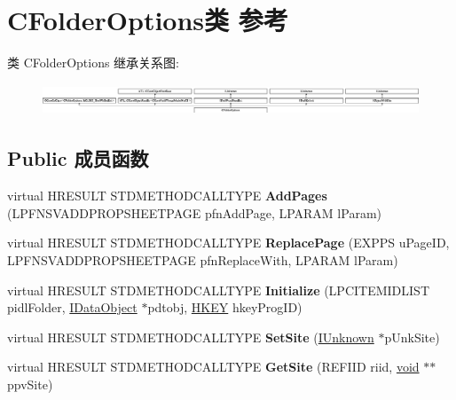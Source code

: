\hypertarget{class_c_folder_options}{}\section{C\+Folder\+Options类 参考}
\label{class_c_folder_options}
类 C\+Folder\+Options 继承关系图\+:\begin{figure}[H]
\begin{center}
\leavevmode
\includegraphics[height=0.943820cm]{class_c_folder_options}
\end{center}
\end{figure}
\subsection*{Public 成员函数}
\begin{DoxyCompactItemize}
\item 
\mbox{\label{class_c_folder_options_a207741f44e6996e8a4e0b17f4b75cbce}} 
virtual H\+R\+E\+S\+U\+LT S\+T\+D\+M\+E\+T\+H\+O\+D\+C\+A\+L\+L\+T\+Y\+PE {\bfseries Add\+Pages} (L\+P\+F\+N\+S\+V\+A\+D\+D\+P\+R\+O\+P\+S\+H\+E\+E\+T\+P\+A\+GE pfn\+Add\+Page, L\+P\+A\+R\+AM l\+Param)
\item 
\mbox{\label{class_c_folder_options_adf0a7376def961ceab74f314aaf0b57e}} 
virtual H\+R\+E\+S\+U\+LT S\+T\+D\+M\+E\+T\+H\+O\+D\+C\+A\+L\+L\+T\+Y\+PE {\bfseries Replace\+Page} (E\+X\+P\+PS u\+Page\+ID, L\+P\+F\+N\+S\+V\+A\+D\+D\+P\+R\+O\+P\+S\+H\+E\+E\+T\+P\+A\+GE pfn\+Replace\+With, L\+P\+A\+R\+AM l\+Param)
\item 
\mbox{\label{class_c_folder_options_a7de8b9322091b2c101a9945c085fb568}} 
virtual H\+R\+E\+S\+U\+LT S\+T\+D\+M\+E\+T\+H\+O\+D\+C\+A\+L\+L\+T\+Y\+PE {\bfseries Initialize} (L\+P\+C\+I\+T\+E\+M\+I\+D\+L\+I\+ST pidl\+Folder, \hyperlink{interface_i_data_object}{I\+Data\+Object} $\ast$pdtobj, \hyperlink{interfacevoid}{H\+K\+EY} hkey\+Prog\+ID)
\item 
\mbox{\label{class_c_folder_options_ac48a0cb053560b7d314e276b3d461bb9}} 
virtual H\+R\+E\+S\+U\+LT S\+T\+D\+M\+E\+T\+H\+O\+D\+C\+A\+L\+L\+T\+Y\+PE {\bfseries Set\+Site} (\hyperlink{interface_i_unknown}{I\+Unknown} $\ast$p\+Unk\+Site)
\item 
\mbox{\label{class_c_folder_options_afb302a0cacaac7e5b4d74752d9a2c436}} 
virtual H\+R\+E\+S\+U\+LT S\+T\+D\+M\+E\+T\+H\+O\+D\+C\+A\+L\+L\+T\+Y\+PE {\bfseries Get\+Site} (R\+E\+F\+I\+ID riid, \hyperlink{interfacevoid}{void} $\ast$$\ast$ppv\+Site)
\end{DoxyCompactItemize}
